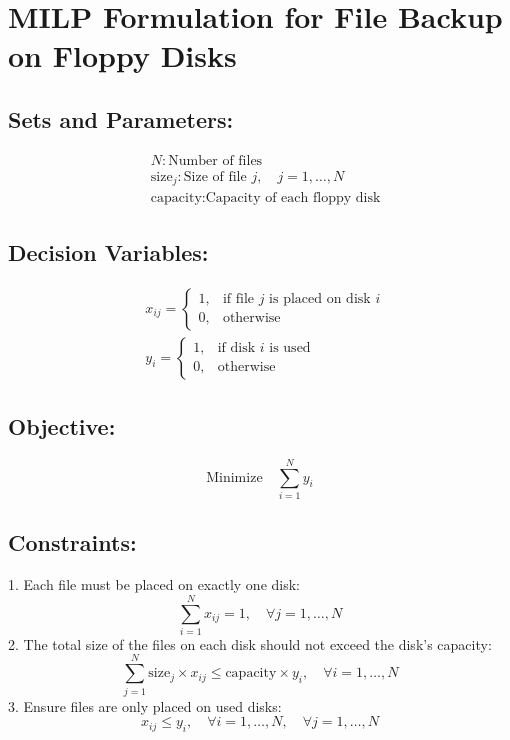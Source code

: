 \documentclass{article}
\begin{document}
\section*{MILP Formulation for File Backup on Floppy Disks}

\subsection*{Sets and Parameters:}
\begin{align*}
  & N: \text{Number of files} \\
  & \text{size}_j: \text{Size of file } j, \quad j = 1, \ldots, N \\
  & \text{capacity}: \text{Capacity of each floppy disk} 
\end{align*}

\subsection*{Decision Variables:}
\begin{align*}
  & x_{ij} = 
  \begin{cases} 
  1, & \text{if file } j \text{ is placed on disk } i \\
  0, & \text{otherwise}
  \end{cases} \\
  & y_i = 
  \begin{cases} 
  1, & \text{if disk } i \text{ is used} \\
  0, & \text{otherwise}
  \end{cases}
\end{align*}

\subsection*{Objective:}
\[
\text{Minimize} \quad \sum_{i=1}^{N} y_i
\]

\subsection*{Constraints:}
1. Each file must be placed on exactly one disk:
\[
\sum_{i=1}^{N} x_{ij} = 1, \quad \forall j = 1, \ldots, N
\]
2. The total size of the files on each disk should not exceed the disk's capacity:
\[
\sum_{j=1}^{N} \text{size}_j \times x_{ij} \leq \text{capacity} \times y_i, \quad \forall i = 1, \ldots, N
\]
3. Ensure files are only placed on used disks:
\[
x_{ij} \leq y_i, \quad \forall i = 1, \ldots, N, \quad \forall j = 1, \ldots, N
\]
\end{document}
